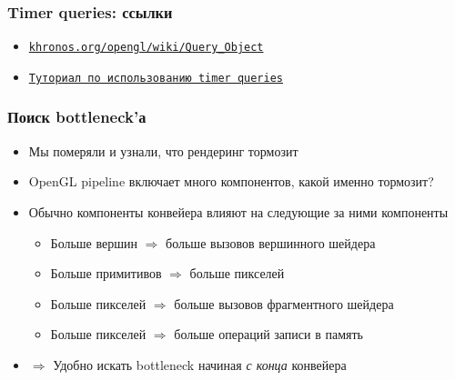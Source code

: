\documentclass{beamer}
\begin{document}
\begin{frame}[fragile]
\frametitle{Timer queries: ссылки}
\begin{itemize}
\item \href{https://www.khronos.org/opengl/wiki/Query_Object}{\texttt{khronos.org/opengl/wiki/Query\_Object}}
\item \href{https://www.lighthouse3d.com/tutorials/opengl-timer-query}{\texttt{Туториал по использованию timer queries}}
\end{itemize}
\end{frame}

\begin{frame}[fragile]
\frametitle{Поиск bottleneck'а}
\begin{itemize}
\item Мы померяли и узнали, что рендеринг тормозит
\pause
\item OpenGL pipeline включает много компонентов, какой именно тормозит?
\pause
\item Обычно компоненты конвейера влияют на следующие за ними компоненты
\pause
\begin{itemize}
\item Больше вершин \begin{math}\Rightarrow\end{math} больше вызовов вершинного шейдера
\item Больше примитивов \begin{math}\Rightarrow\end{math} больше пикселей
\item Больше пикселей \begin{math}\Rightarrow\end{math} больше вызовов фрагментного шейдера
\item Больше пикселей \begin{math}\Rightarrow\end{math} больше операций записи в память
\end{itemize}
\pause
\item \begin{math}\Longrightarrow\end{math} Удобно искать bottleneck начиная \textit{с конца} конвейера
\end{itemize}
\end{frame}
\end{document}
